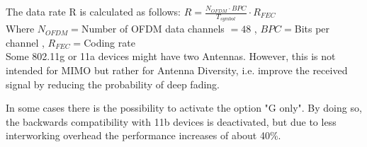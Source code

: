 	The data rate R is calculated as follows: $R=\frac{N_{OFDM}\cdot BPC}{T_{symbol}}\cdot R_{FEC}$ \\
	Where $N_{OFDM}=$Number of OFDM data channels $=48$ , $BPC=$Bits per channel , $R_{FEC}=$Coding rate \\
	
	Some 802.11g or 11a devices might have two Antennas. However, this is not intended for MIMO but rather
	for Antenna Diversity, i.e. improve the received signal by reducing the probability of deep fading. 

	In some cases there is the possibility to activate the option "G only". By doing so, the backwards
	compatibility with 11b devices is deactivated, but due to less interworking overhead the performance
	increases of about 40\%.
	
